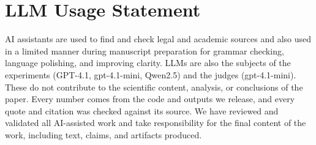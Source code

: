 \documentclass[11pt]{article}
\begin{document}
\clearpage
\section*{LLM Usage Statement}

AI assistants are used to find and check legal and academic sources and also used in a limited manner during manuscript preparation for grammar checking, language polishing, and improving clarity. LLMs are also the subjects of the experiments (GPT-4.1, gpt-4.1-mini, Qwen2.5) and the judges (gpt-4.1-mini). These do not contribute to the scientific content, analysis, or conclusions of the paper. Every number comes from the code and outputs we release, and every quote and citation was checked against its source. We have reviewed and validated all AI-assisted work and take responsibility for the final content of the work, including text, claims, and artifacts produced.
\end{document}
